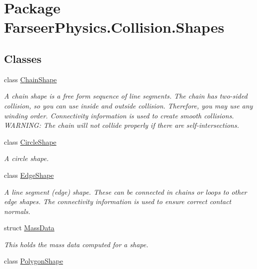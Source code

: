 \hypertarget{namespace_farseer_physics_1_1_collision_1_1_shapes}{\section{Package Farseer\+Physics.\+Collision.\+Shapes}
\label{namespace_farseer_physics_1_1_collision_1_1_shapes}
}
\subsection*{Classes}
\begin{DoxyCompactItemize}
\item 
class \hyperlink{class_farseer_physics_1_1_collision_1_1_shapes_1_1_chain_shape}{Chain\+Shape}
\begin{DoxyCompactList}\small\item\em A chain shape is a free form sequence of line segments. The chain has two-\/sided collision, so you can use inside and outside collision. Therefore, you may use any winding order. Connectivity information is used to create smooth collisions. W\+A\+R\+N\+I\+N\+G\+: The chain will not collide properly if there are self-\/intersections. \end{DoxyCompactList}\item 
class \hyperlink{class_farseer_physics_1_1_collision_1_1_shapes_1_1_circle_shape}{Circle\+Shape}
\begin{DoxyCompactList}\small\item\em A circle shape. \end{DoxyCompactList}\item 
class \hyperlink{class_farseer_physics_1_1_collision_1_1_shapes_1_1_edge_shape}{Edge\+Shape}
\begin{DoxyCompactList}\small\item\em A line segment (edge) shape. These can be connected in chains or loops to other edge shapes. The connectivity information is used to ensure correct contact normals. \end{DoxyCompactList}\item 
struct \hyperlink{struct_farseer_physics_1_1_collision_1_1_shapes_1_1_mass_data}{Mass\+Data}
\begin{DoxyCompactList}\small\item\em This holds the mass data computed for a shape. \end{DoxyCompactList}\item 
class \hyperlink{class_farseer_physics_1_1_collision_1_1_shapes_1_1_polygon_shape}{Polygon\+Shape}

\end{DoxyCompactItemize}
